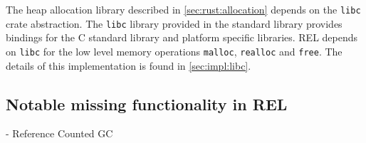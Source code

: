 The heap allocation library described in \autoref{sec:rust:allocation} depends on the \texttt{libc} crate abstraction.
The \texttt{libc} library provided in the standard library provides bindings for the C standard library and platform specific libraries.
REL depends on \texttt{libc} for the low level memory operations \texttt{malloc}, \texttt{realloc} and \texttt{free}.
The details of this implementation is found in \autoref{sec:impl:libc}. 

\subsection{Notable missing functionality in REL}

- Reference Counted GC

